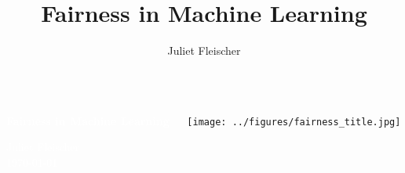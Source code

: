 \documentclass[aspectratio=169]{beamer}
\title{Fairness in Machine Learning}
\author{Juliet Fleischer} %
\institute[LMU]{LMU} %
{

}
\begin{document}
{
\begin{frame}
\begin{columns}
	\begin{column}{0.4\textwidth}
		\vspace{3cm}
		
		\textbf{\textcolor{white}{\Large Fairness in Machine Learning}}
		\vspace{1cm}
		
		\textcolor{white}{\footnotesize Juliet Fleischer \\
			\today}
	\end{column}
	\begin{column}{0.49\textwidth}
		\vspace{2cm}
		\begin{center}
			\texttt{[image: ../figures/fairness\_title.jpg]}
		\end{center}
	\end{column}
\end{columns}
\end{frame}
}
\end{document}

